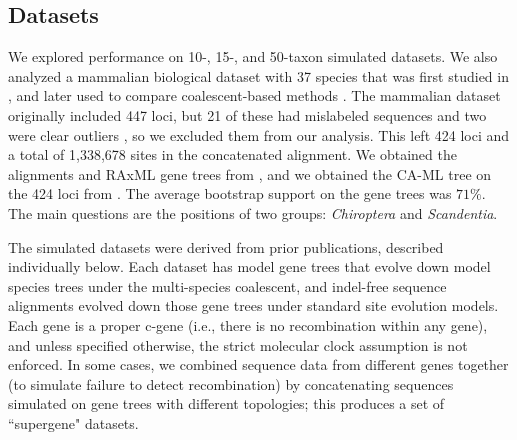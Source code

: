 \subsection{Datasets}

We explored performance on 10-, 15-, and 50-taxon simulated datasets. 
We also analyzed a  mammalian biological dataset  with 37 species that was
first studied in \cite{Song2012}, and later used to compare coalescent-based methods
\cite{astral,SpringerGatesy2016,bayzid2013naive}. 
The mammalian dataset originally included 447 loci, but 21 of these
had mislabeled sequences and two were clear outliers \cite{astral},
so we excluded them from our analysis. 
This left 424 loci and a total of 1,338,678 sites in the
concatenated alignment.  
We obtained the alignments and RAxML gene trees from \cite{Song2012}, and we obtained the CA-ML tree on the 424 loci from \cite{astral}.
The average bootstrap support on the gene trees was $71\%$.  The main questions are the
positions of two groups: \emph{Chiroptera} and \emph{Scandentia}.



    



The simulated datasets were derived from prior publications, described
individually below.  Each dataset has model gene trees that evolve
down model species trees under the multi-species coalescent, and
indel-free sequence alignments evolved down those gene trees under
standard site evolution models.  Each gene is a proper c-gene (i.e.,
there is no recombination within any gene), and unless specified
otherwise, the strict molecular clock assumption is not enforced.  
In some cases, we combined sequence data from different genes together (to simulate  failure to detect recombination)  by concatenating sequences
simulated on gene trees with different topologies; this produces a set of ``supergene" datasets.

